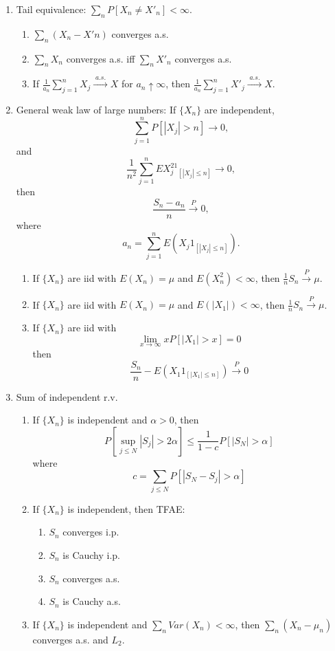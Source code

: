 \documentclass{article}
\newcommand{\as}{\;a.s.\;}
\newcommand{\pto}{\overset{P}{\to}}
\newcommand{\asto}{\overset{\as}{\to}}
\begin{document}
\begin{enumerate}
\item Tail equivalence: $\sum_n P[X_n \neq X'_n] < \infty$.
  \begin{enumerate}
  \item $\sum_n(X_n - X'n)$ converges a.s.
  \item $\sum_n X_n$ converges a.s. iff $\sum_n X'_n$ converges a.s.
  \item If $\frac{1}{a_n} \sum_{j=1}^n X_j \asto X$ for $a_n \uparrow \infty$, then $\frac{1}{a_n} \sum_{j=1}^n X'_j \asto X$.
  \end{enumerate}
\item General weak law of large numbers: 
  If $\{X_n\}$ are independent,
  \[
    \sum_{j=1}^n P[|X_j| > n] \to 0,
  \]
  and
  \[
    \frac{1}{n^2} \sum_{j=1}^n EX_j^21_{[|X_j| \leq n]} \to 0,
  \]
  then
  \[
    \frac{S_n - a_n}{n} \pto 0,
  \]
  where \[
    a_n = \sum_{j=1}^n E(X_j 1_{[|X_j| \leq n]}).
  \]
  \begin{enumerate}
  \item If $\{X_n\}$ are iid with $E(X_n) = \mu$ and $E(X_n^2) < \infty$, then $\frac{1}{n} S_n \pto \mu$.
  \item If $\{X_n\}$ are iid with $E(X_n) = \mu$ and $E(|X_1|) < \infty$, then $\frac{1}{n} S_n \pto \mu$.
  \item If $\{X_n\}$ are iid with
    \[
      \lim_{x \to \infty} xP[|X_1| > x] = 0
    \]
    then
    \[
      \frac{S_n}{n} - E(X_1 1_{[|X_1| \leq n]}) \pto 0
    \]
  \end{enumerate}
\item Sum of independent r.v.
  \begin{enumerate}
  \item If $\{X_n\}$ is independent and $\alpha >0$,
    then
    \[
      P[\sup_{j \leq N} |S_j| > 2\alpha] \leq \frac{1}{1-c} P[|S_N| > \alpha]
    \]
    where
    \[
      c = \sum_{j \leq N} P[|S_N - S_j| > \alpha]
    \]
  \item If $\{X_n\}$ is independent, then TFAE:
    \begin{enumerate}
    \item $S_n$ converges i.p.
    \item $S_n$ is Cauchy i.p.
    \item $S_n$ converges a.s.
    \item $S_n$ is Cauchy a.s.
    \end{enumerate}
  \item If $\{X_n\}$ is independent and $\sum_n Var(X_n) < \infty$, then $\sum_n(X_n - \mu_n)$ converges a.s. and $L_2$.

\end{enumerate}
\end{enumerate}
\end{document}
